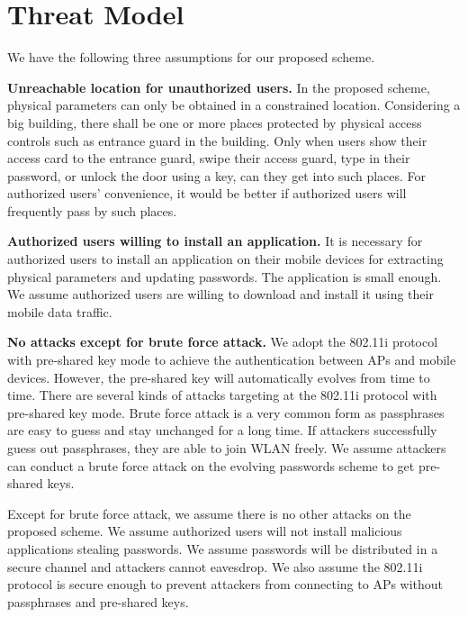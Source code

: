 \section{Threat Model}
We have the following three assumptions for our proposed scheme. 

\textbf{Unreachable location for unauthorized users.} In the proposed scheme, physical parameters can only be obtained in a constrained location. Considering a big building, there shall be one or more places protected by physical access controls such as entrance guard in the building. Only when users show their access card to the entrance guard, swipe their access guard, type in their password, or unlock the door using a key, can they get into such places. For authorized users’ convenience, it would be better if authorized users will frequently pass by such places. 

\textbf{Authorized users willing to install an application.} It is necessary for authorized users to install an application on their mobile devices for extracting physical parameters and updating passwords. The application is small enough. We assume authorized users are willing to download and install it using their mobile data traffic. 

\textbf{No attacks except for brute force attack.} We adopt the 802.11i protocol with pre-shared key mode to achieve the authentication between APs and mobile devices. However, the pre-shared key will automatically evolves from time to time. There are several kinds of attacks targeting at the 802.11i protocol with pre-shared key mode. Brute force attack is a very common form as passphrases are easy to guess and stay unchanged for a long time. If attackers successfully guess out passphrases, they are able to join WLAN freely. We assume attackers can conduct a brute force attack on the evolving passwords scheme to get pre-shared keys. 

Except for brute force attack, we assume there is no other attacks on the proposed scheme. We assume authorized users will not install malicious applications stealing passwords. We assume passwords will be distributed in a secure channel and attackers cannot eavesdrop. We also assume the 802.11i protocol is secure enough to prevent attackers from connecting to APs without passphrases and pre-shared keys. 

